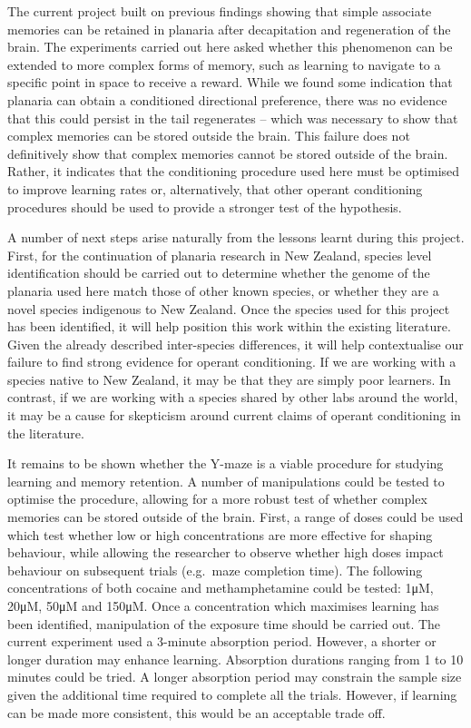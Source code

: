 \documentclass[
  jou,
  floatsintext,
  longtable,
  nolmodern,
  notxfonts,
  notimes,
  donotrepeattitle,
  colorlinks=true,linkcolor=blue,citecolor=blue,urlcolor=blue]{apa7}
\begin{document}
The current project built on previous findings showing that simple
associate memories can be retained in planaria after decapitation and
regeneration of the brain. The experiments carried out here asked
whether this phenomenon can be extended to more complex forms of memory,
such as learning to navigate to a specific point in space to receive a
reward. While we found some indication that planaria can obtain a
conditioned directional preference, there was no evidence that this
could persist in the tail regenerates -- which was necessary to show
that complex memories can be stored outside the brain. This failure does
not definitively show that complex memories cannot be stored outside of
the brain. Rather, it indicates that the conditioning procedure used
here must be optimised to improve learning rates or, alternatively, that
other operant conditioning procedures should be used to provide a
stronger test of the hypothesis.

A number of next steps arise naturally from the lessons learnt during
this project. First, for the continuation of planaria research in New
Zealand, species level identification should be carried out to determine
whether the genome of the planaria used here match those of other known
species, or whether they are a novel species indigenous to New Zealand.
Once the species used for this project has been identified, it will help
position this work within the existing literature. Given the already
described inter-species differences, it will help contextualise our
failure to find strong evidence for operant conditioning. If we are
working with a species native to New Zealand, it may be that they are
simply poor learners. In contrast, if we are working with a species
shared by other labs around the world, it may be a cause for skepticism
around current claims of operant conditioning in the literature.

It remains to be shown whether the Y-maze is a viable procedure for
studying learning and memory retention. A number of manipulations could
be tested to optimise the procedure, allowing for a more robust test of
whether complex memories can be stored outside of the brain. First, a
range of doses could be used which test whether low or high
concentrations are more effective for shaping behaviour, while allowing
the researcher to observe whether high doses impact behaviour on
subsequent trials (e.g.~maze completion time). The following
concentrations of both cocaine and methamphetamine could be tested: 1μM,
20μM, 50μM and 150μM. Once a concentration which maximises learning has
been identified, manipulation of the exposure time should be carried
out. The current experiment used a 3-minute absorption period. However,
a shorter or longer duration may enhance learning. Absorption durations
ranging from 1 to 10 minutes could be tried. A longer absorption period
may constrain the sample size given the additional time required to
complete all the trials. However, if learning can be made more
consistent, this would be an acceptable trade off.
\end{document}
